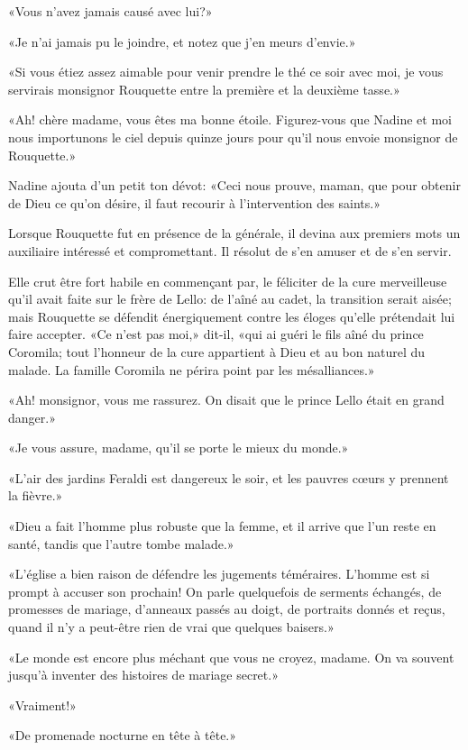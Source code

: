 «Vous n'avez jamais causé avec lui?»

«Je n'ai jamais pu le joindre, et notez que j'en meurs d'envie.»

«Si vous étiez assez aimable pour venir prendre le thé ce soir avec moi,
je vous servirais monsignor Rouquette entre la première et la deuxième
tasse.»

«Ah! chère madame, vous êtes ma bonne étoile. Figurez-vous que Nadine et
moi nous importunons le ciel depuis quinze jours pour qu'il nous envoie
monsignor de Rouquette.»

Nadine ajouta d'un petit ton dévot: «Ceci nous prouve, maman, que pour
obtenir de Dieu ce qu'on désire, il faut recourir à l'intervention des
saints.»

Lorsque Rouquette fut en présence de la générale, il devina aux premiers
mots un auxiliaire intéressé et compromettant. Il résolut de s'en amuser
et de s'en servir.

Elle crut être fort habile en commençant par, le féliciter de la cure
merveilleuse qu'il avait faite sur le frère de Lello: de l'aîné au
cadet, la transition serait aisée; mais Rouquette se défendit
énergiquement contre les éloges qu'elle prétendait lui faire accepter.
«Ce n'est pas moi,» dit-il, «qui ai guéri le fils aîné du prince
Coromila; tout l'honneur de la cure appartient à Dieu et au bon naturel
du malade. La famille Coromila ne périra point par les mésalliances.»

«Ah! monsignor, vous me rassurez. On disait que le prince Lello était en
grand danger.»

«Je vous assure, madame, qu'il se porte le mieux du monde.»

«L'air des jardins Feraldi est dangereux le soir, et les pauvres cœurs y
prennent la fièvre.»

«Dieu a fait l'homme plus robuste que la femme, et il arrive que l'un
reste en santé, tandis que l'autre tombe malade.»

«L'église a bien raison de défendre les jugements téméraires. L'homme
est si prompt à accuser son prochain! On parle quelquefois de serments
échangés, de promesses de mariage, d'anneaux passés au doigt, de
portraits donnés et reçus, quand il n'y a peut-être rien de vrai que
quelques baisers.»

«Le monde est encore plus méchant que vous ne croyez, madame. On va
souvent jusqu'à inventer des histoires de mariage secret.»

«Vraiment!»

«De promenade nocturne en tête à tête.»

